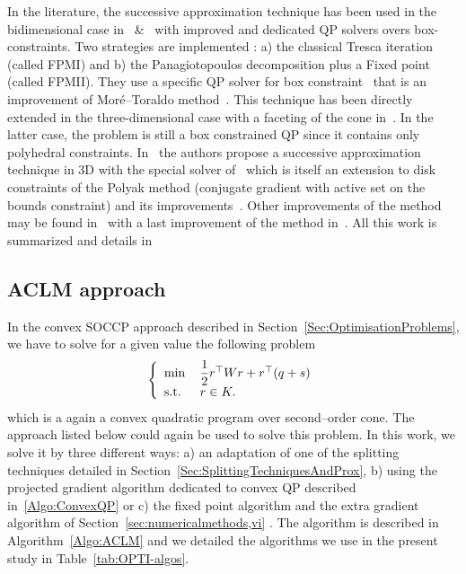 In the literature, the successive approximation technique has been used in the bidimensional case in~\citep{Haslinger.ea_CMAME2002} \&~\citep{Dostal_JCAM2002} with improved and dedicated QP solvers overs box-constraints. Two strategies are implemented : a) the classical Tresca iteration (called FPMI) and  b) the Panagiotopoulos decomposition plus a Fixed point (called FPMII). They use  a specific QP solver for box constraint~\cite{Dostal_SIOPT1997} that is an improvement of Mor\'e--Toraldo method~\citep{More.Toraldo1991}. This technique has been directly extended in the three-dimensional case with a faceting of the cone in~\cite{Haslinger.ea_JCAM2004}. In the latter case, the problem is still a  box constrained QP since it contains only polyhedral constraints. In~\cite{Haslinger.ea_MCS2012} the authors propose a successive approximation technique in 3D with the special solver of~\cite{Kucera_OMS2007,Kucera_SIOPT2008} which is itself an extension to disk constraints of the Polyak method (conjugate gradient with active set on the bounds constraint) and its improvements~\cite{Dostal_SIOPT1997,Dostal.Schoberl_COA2005}. Other improvements of the method may be found in~\cite{Dostal.Kucera_SIOPT2010} with a last improvement of the method in~\cite{Dostal.Kozubek_MP2012}. All this work is summarized and details in ~\cite{Dostal.ea_AMM2016}


\subsection{ACLM approach}

In the convex SOCCP approach described in Section~\ref{Sec:OptimisationProblems}, we have to solve for a given value the following problem
\begin{equation}\label{eq:ACLM-4}
  \left\{
    \begin{array}{ll}
      \min\,&\Frac 1 2 r^\top W r + r^\top (q + s)  \\
      \text{s.t. } & r \in K.
    \end{array}
  \right.
\end{equation}
which is a again a convex quadratic program over second--order cone. The approach listed below could again be used to solve this problem. In this work, we solve it by three different ways: a) an adaptation of one of the splitting techniques detailed in Section~\ref{Sec:SplittingTechniquesAndProx}, b) using the projected gradient algorithm dedicated to convex QP described in~\ref{Algo:ConvexQP} or c) the fixed point algorithm and the extra gradient algorithm of Section~\ref{sec:numericalmethods,vi} . The algorithm is described in Algorithm~\ref{Algo:ACLM} and we detailed the algorithms we use in the present study in Table~\ref{tab:OPTI-algos}.

